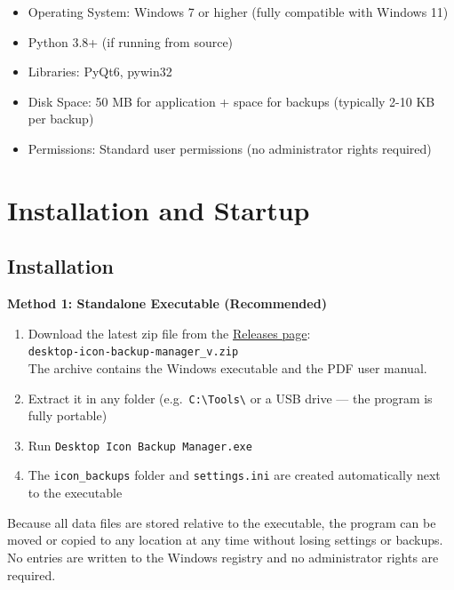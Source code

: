 \documentclass[a4paper,11pt]{article}
\begin{document}
\begin{infobox}
  \begin{itemize}[leftmargin=*]
    \item Operating System: Windows 7 or higher (fully compatible
      with Windows 11)
    \item Python 3.8+ (if running from source)
    \item Libraries: PyQt6, pywin32
    \item Disk Space: 50 MB for application + space for backups
      (typically 2-10 KB per backup)
    \item Permissions: Standard user permissions (no administrator
      rights required)
  \end{itemize}
\end{infobox}
\pagebreak
\section{Installation and Startup}

\subsection{Installation}

\textbf{Method 1: Standalone Executable (Recommended)}
\begin{enumerate}
  \item Download the latest zip file from the
    \href{https://github.com/mapi68/%
    desktop-icon-backup-manager/releases/latest}{Releases page}:\\
    \texttt{desktop-icon-backup-manager\_v\unskip.zip}\\
    The archive contains the Windows executable and the
    PDF user manual.
  \item Extract it in any folder
    (e.g.\ \texttt{C:\textbackslash{}Tools\textbackslash{}}
    or a USB drive --- the program is fully portable)
  \item Run \texttt{Desktop Icon Backup Manager.exe}
  \item The \texttt{icon\_backups} folder and \texttt{settings.ini}
    are created automatically next to the executable
\end{enumerate}

Because all data files are stored relative to the executable,
the program can be moved or copied to any location at any time
without losing settings or backups. No entries are written to
the Windows registry and no administrator rights are required.
\end{document}
